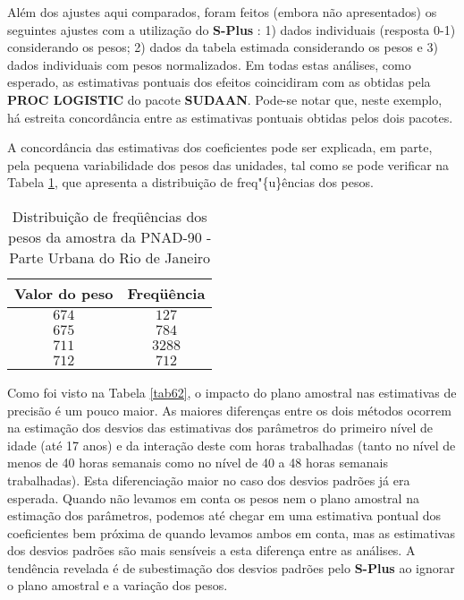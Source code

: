 \documentclass[]{book}
\begin{document}
Além dos ajustes aqui comparados, foram feitos (embora não apresentados)
os seguintes ajustes com a utilização do \textbf{S-Plus%
}: 1) dados individuais (resposta 0-1) considerando os pesos; 2) dados
da tabela estimada considerando os pesos e 3) dados individuais com
pesos normalizados. Em todas estas análises, como esperado, as
estimativas pontuais dos efeitos coincidiram com as obtidas pela
\textbf{PROC LOGISTIC} do pacote \textbf{SUDAAN}. Pode-se notar que,
neste exemplo, há estreita concordância entre as estimativas pontuais
obtidas pelos dois pacotes.

A concordância das estimativas dos coeficientes pode ser explicada, em
parte, pela pequena variabilidade dos pesos das unidades, tal como se
pode verificar na Tabela \ref{tab66}, que apresenta a distribuição de
freq"\{u\}ências dos pesos.

\begin{center}
\begin{table}[tbp] \centering%
\caption{Distribuição de freqüências dos pesos da amostra da PNAD-90 - Parte
Urbana do Rio de Janeiro}\bigskip \label{tab66} 
\begin{tabular}{|c|c|}
\hline\hline
Valor do peso & Freq\"{u}ência \\ \hline\hline
$674$ & $127$ \\ 
$675$ & $784$ \\ 
$711$ & $3288$ \\ 
$712$ & $712$ \\ \hline\hline
\end{tabular}
\end{table}%
\end{center}

Como foi visto na Tabela \ref{tab62}, o impacto do plano amostral nas
estimativas de precisão é um pouco maior. As maiores diferenças entre os
dois métodos ocorrem na estimação dos desvios das estimativas dos
parâmetros do primeiro nível de idade (até 17 anos) e da interação deste
com horas trabalhadas (tanto no nível de menos de 40 horas semanais como
no nível de 40 a 48 horas semanais trabalhadas). Esta diferenciação
maior no caso dos desvios padrões já era esperada. Quando não levamos em
conta os pesos nem o plano amostral na estimação dos parâmetros, podemos
até chegar em uma estimativa pontual dos coeficientes bem próxima de
quando levamos ambos em conta, mas as estimativas dos desvios padrões
são mais sensíveis a esta diferença entre as análises. A tendência
revelada é de subestimação dos desvios padrões pelo \textbf{S-Plus} ao
ignorar o plano amostral e a variação dos pesos.
\end{document}
